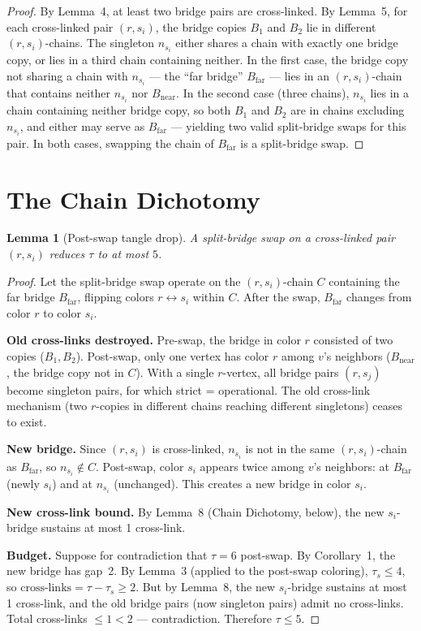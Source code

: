 \documentclass[11pt]{article}
\newtheorem{lemma}[theorem]{Lemma}
\theoremstyle{remark}
\begin{document}
\begin{proof}
By Lemma~4, at least two bridge pairs are cross-linked. By Lemma~5, for each cross-linked pair $(r, s_i)$, the bridge copies $B_1$ and $B_2$ lie in different $(r, s_i)$-chains. The singleton $n_{s_i}$ either shares a chain with exactly one bridge copy, or lies in a third chain containing neither. In the first case, the bridge copy not sharing a chain with $n_{s_i}$ --- the ``far bridge'' $B_{\mathrm{far}}$ --- lies in an $(r, s_i)$-chain that contains neither $n_{s_i}$ nor $B_{\mathrm{near}}$. In the second case (three chains), $n_{s_i}$ lies in a chain containing neither bridge copy, so both $B_1$ and $B_2$ are in chains excluding $n_{s_i}$, and either may serve as $B_{\mathrm{far}}$ --- yielding two valid split-bridge swaps for this pair. In both cases, swapping the chain of $B_{\mathrm{far}}$ is a split-bridge swap.
\end{proof}

\section{The Chain Dichotomy}

\begin{lemma}[Post-swap tangle drop]
A split-bridge swap on a cross-linked pair $(r, s_i)$ reduces $\tau$ to at most $5$.
\end{lemma}

\begin{proof}
Let the split-bridge swap operate on the $(r, s_i)$-chain $C$ containing the far bridge $B_{\mathrm{far}}$, flipping colors $r \leftrightarrow s_i$ within $C$. After the swap, $B_{\mathrm{far}}$ changes from color $r$ to color $s_i$.

\medskip
\noindent\textbf{Old cross-links destroyed.} Pre-swap, the bridge in color $r$ consisted of two copies ($B_1, B_2$). Post-swap, only one vertex has color $r$ among $v$'s neighbors ($B_{\mathrm{near}}$, the bridge copy not in $C$). With a single $r$-vertex, all bridge pairs $(r, s_j)$ become singleton pairs, for which strict = operational. The old cross-link mechanism (two $r$-copies in different chains reaching different singletons) ceases to exist.

\medskip
\noindent\textbf{New bridge.} Since $(r, s_i)$ is cross-linked, $n_{s_i}$ is not in the same $(r, s_i)$-chain as $B_{\mathrm{far}}$, so $n_{s_i} \notin C$. Post-swap, color $s_i$ appears twice among $v$'s neighbors: at $B_{\mathrm{far}}$ (newly $s_i$) and at $n_{s_i}$ (unchanged). This creates a new bridge in color $s_i$.

\medskip
\noindent\textbf{New cross-link bound.} By Lemma~8 (Chain Dichotomy, below), the new $s_i$-bridge sustains at most 1 cross-link.

\medskip
\noindent\textbf{Budget.} Suppose for contradiction that $\tau = 6$ post-swap. By Corollary~1, the new bridge has gap~2. By Lemma~3 (applied to the post-swap coloring), $\tau_s \leq 4$, so $\text{cross-links} = \tau - \tau_s \geq 2$. But by Lemma~8, the new $s_i$-bridge sustains at most 1 cross-link, and the old bridge pairs (now singleton pairs) admit no cross-links. Total cross-links $\leq 1 < 2$ --- contradiction. Therefore $\tau \leq 5$.
\end{proof}
\end{document}
